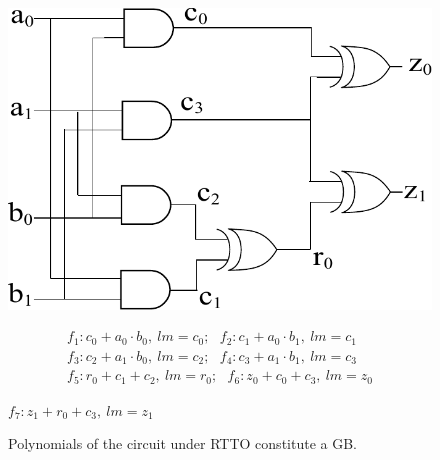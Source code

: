 \begin{figure}[!h]
\begin{minipage}[t]{3.25in}
\centerline{
\includegraphics[scale=0.5]{figures/2bitmultiplier_gates.pdf}
}
\caption{\small A 2-bit modulo Multiplier circuit. 
  } 
\label{fig:mul2bit}
\end{minipage}
\hfill
\begin{minipage}[t]{3.25in}
\vspace{0pt}
\begin{align*}
f_1: c_0+a_0 \cdot b_0, \ lm=c_0; ~~~f_2: c_1+a_0 \cdot b_1, \ lm=c_1 \nonumber \\
f_3: c_2+a_1 \cdot b_0, \ lm=c_2; ~~~f_4: c_3+a_1 \cdot b_1, \ lm=c_3 \nonumber \\
f_5: r_0+c_1 + c_2 , \ lm=r_0; ~~~f_6: z_0+c_0 + c_3, \ lm=z_0\nonumber
\end{align*}
\vspace{-0.35in}
\begin{center}
$f_7: z_1+r_0 + c_3, \ lm=z_1$ %
\end{center}
\caption{\small {Polynomials of the circuit under RTTO constitute a GB.
}} 
\label{fig:rel_prime_lt}
\end{minipage}

\end{figure}

